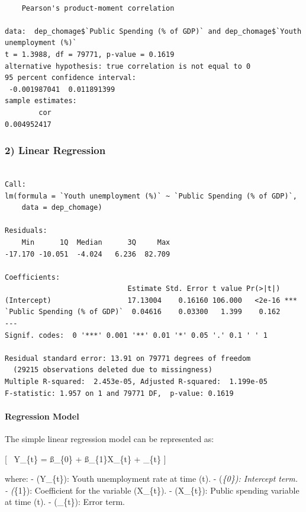 \documentclass[
  letterpaper,
  DIV=11,
  numbers=noendperiod]{scrartcl}
\let\oldparagraph\paragraph
\renewcommand{\paragraph}[1]{\oldparagraph{#1}\mbox{}}
\begin{document}
\begin{verbatim}

    Pearson's product-moment correlation

data:  dep_chomage$`Public Spending (% of GDP)` and dep_chomage$`Youth unemployment (%)`
t = 1.3988, df = 79771, p-value = 0.1619
alternative hypothesis: true correlation is not equal to 0
95 percent confidence interval:
 -0.001987041  0.011891399
sample estimates:
        cor 
0.004952417 
\end{verbatim}

\hypertarget{linear-regression}{%
\subsubsection{2) Linear Regression}\label{linear-regression}}

\begin{verbatim}

Call:
lm(formula = `Youth unemployment (%)` ~ `Public Spending (% of GDP)`, 
    data = dep_chomage)

Residuals:
    Min      1Q  Median      3Q     Max 
-17.170 -10.051  -4.024   6.236  82.709 

Coefficients:
                             Estimate Std. Error t value Pr(>|t|)    
(Intercept)                  17.13004    0.16160 106.000   <2e-16 ***
`Public Spending (% of GDP)`  0.04616    0.03300   1.399    0.162    
---
Signif. codes:  0 '***' 0.001 '**' 0.01 '*' 0.05 '.' 0.1 ' ' 1

Residual standard error: 13.91 on 79771 degrees of freedom
  (29215 observations deleted due to missingness)
Multiple R-squared:  2.453e-05, Adjusted R-squared:  1.199e-05 
F-statistic: 1.957 on 1 and 79771 DF,  p-value: 0.1619
\end{verbatim}

\hypertarget{regression-model}{%
\paragraph{Regression Model}\label{regression-model}}

The simple linear regression model can be represented as:

{[} ~Y\_\{t\} = ß\_\{0\} + ß\_\{1\}X\_\{t\} + \varepsilon\_\{t\} {]}

where: - (Y\_\{t\}): Youth unemployment rate at time (t). -
(\beta\emph{\{0\}): Intercept term. - (\beta}\{1\}): Coefficient for the
variable (X\_\{t\}). - (X\_\{t\}): Public spending variable at time (t).
- (\epsilon\_\{t\}): Error term.
\end{document}
